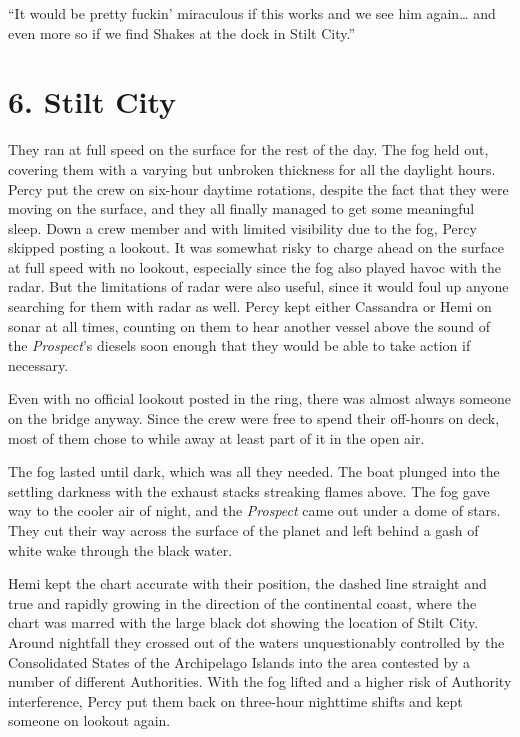 \documentclass[
]{scrbook}
\begin{document}
``It would be pretty fuckin' miraculous if this works and we see him
again\ldots{} and even more so if we find Shakes at the dock in Stilt
City.''

\newpage

\hypertarget{stilt-city}{%
\section{6. Stilt City}\label{stilt-city}}

They ran at full speed on the surface for the rest of the day. The fog
held out, covering them with a varying but unbroken thickness for all
the daylight hours. Percy put the crew on six-hour daytime rotations,
despite the fact that they were moving on the surface, and they all
finally managed to get some meaningful sleep. Down a crew member and
with limited visibility due to the fog, Percy skipped posting a lookout.
It was somewhat risky to charge ahead on the surface at full speed with
no lookout, especially since the fog also played havoc with the radar.
But the limitations of radar were also useful, since it would foul up
anyone searching for them with radar as well. Percy kept either
Cassandra or Hemi on sonar at all times, counting on them to hear
another vessel above the sound of the \emph{Prospect}'s diesels soon
enough that they would be able to take action if necessary.

Even with no official lookout posted in the ring, there was almost
always someone on the bridge anyway. Since the crew were free to spend
their off-hours on deck, most of them chose to while away at least part
of it in the open air.

The fog lasted until dark, which was all they needed. The boat plunged
into the settling darkness with the exhaust stacks streaking flames
above. The fog gave way to the cooler air of night, and the
\emph{Prospect} came out under a dome of stars. They cut their way
across the surface of the planet and left behind a gash of white wake
through the black water.

Hemi kept the chart accurate with their position, the dashed line
straight and true and rapidly growing in the direction of the
continental coast, where the chart was marred with the large black dot
showing the location of Stilt City. Around nightfall they crossed out of
the waters unquestionably controlled by the Consolidated States of the
Archipelago Islands into the area contested by a number of different
Authorities. With the fog lifted and a higher risk of Authority
interference, Percy put them back on three-hour nighttime shifts and
kept someone on lookout again.
\end{document}
